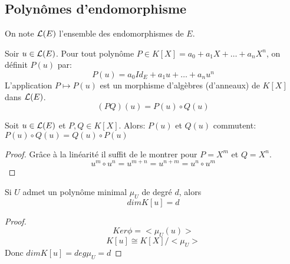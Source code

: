 \subsection{Polynômes d'endomorphisme}
On note $\mathcal{L}(E)$ l'ensemble des endomorphismes de $E$.

\begin{definition}
	Soir $u \in \mathcal{L}(E)$. Pour tout polynôme $P \in K[X] = a_0 + a_1X + \ldots + a_nX^n$, on définit $P(u)$ par:
	$$P(u) = a_0 Id_E + a_1 u + \ldots + a_n u^n$$
	L'application $P \mapsto P(u)$ est un morphisme d'algèbres (d'anneaux) de $K[X]$ dans $\mathcal{L}(E)$.
	$$(PQ)(u) = P(u)\circ Q(u)$$
\end{definition}

\begin{prop}
	Soit $u \in \mathcal{L}(E)$ et $P, Q \in K[X]$. Alors:
	$P(u)$ et $Q(u)$ commutent: $P(u)\circ Q(u) = Q(u)\circ P(u)$
\end{prop}

\begin{proof}
	Grâce à la linéarité il suffit de le montrer pour $P = X^m$ et $Q = X^n$.
	$$u^m\circ u^n = u^{m+n} = u^{n+m} = u^n\circ u^m$$
\end{proof}

\begin{remarque}
	Si $U$ admet un polynôme minimal $\mu_U$ de degré $d$, alors
	$$ dim K[u] = d $$
\end{remarque}



\begin{proof}
	$$Ker \phi = <\mu_U(u)>$$
	$$ K[u] \cong K[X] / <\mu_U>$$
	Donc $dim K[u] = deg \mu_U = d$
\end{proof}

